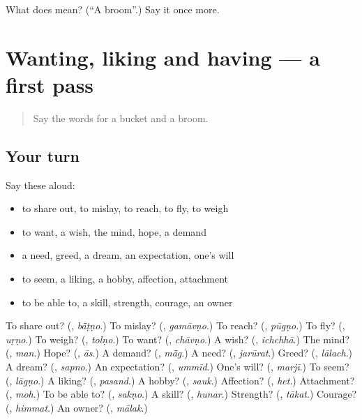\begin{tcolorbox}[breakable,colback=teal!4,colframe=teal!35!black,title={Before you move on}]
What does  mean? (\textquotedblleft{}A broom\textquotedblright{}.) Say it once more.
\end{tcolorbox}
\section[(dialogue)]{Wanting, liking and having — a first pass}

\label{lesson:MW-R119-first-pass-wanting-liking-and-having}



\begin{quote}
Say the words for a bucket and a broom.
\end{quote}

\subsection*{Your turn}
Say these aloud:

\begin{itemize}
\raggedright
  \item to share out, to mislay, to reach, to fly, to weigh
  \item to want, a wish, the mind, hope, a demand
  \item a need, greed, a dream, an expectation, one's will
  \item to seem, a liking, a hobby, affection, attachment
  \item to be able to, a skill, strength, courage, an owner
\end{itemize}

\begin{tcolorbox}[breakable,colback=teal!4,colframe=teal!35!black,title={Before you move on}]
To share out? (\textbf{}, \emph{bā̃ṭṇo}.) To mislay? (\textbf{}, \emph{gamāvṇo}.) To reach? (\textbf{}, \emph{pūgṇo}.) To fly? (\textbf{}, \emph{uṛṇo}.) To weigh? (\textbf{}, \emph{tolṇo}.) To want? (\textbf{}, \emph{chāvṇo}.) A wish? (\textbf{}, \emph{ichchhā}.) The mind? (\textbf{}, \emph{man}.) Hope? (\textbf{}, \emph{ās}.) A demand? (\textbf{}, \emph{mā̃g}.) A need? (\textbf{}, \emph{jarūrat}.) Greed? (\textbf{}, \emph{lālach}.) A dream? (\textbf{}, \emph{sapno}.) An expectation? (\textbf{}, \emph{ummīd}.) One's will? (\textbf{}, \emph{marjī}.) To seem? (\textbf{}, \emph{lāgṇo}.) A liking? (\textbf{}, \emph{pasand}.) A hobby? (\textbf{}, \emph{sauk}.) Affection? (\textbf{}, \emph{het}.) Attachment? (\textbf{}, \emph{moh}.) To be able to? (\textbf{}, \emph{sakṇo}.) A skill? (\textbf{}, \emph{hunar}.) Strength? (\textbf{}, \emph{tākat}.) Courage? (\textbf{}, \emph{himmat}.) An owner? (\textbf{}, \emph{mālak}.)
\end{tcolorbox}
